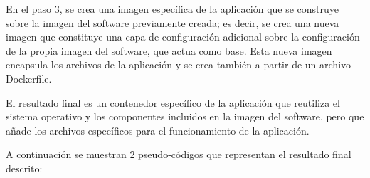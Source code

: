                 En el paso 3, se crea una imagen específica de la aplicación que se construye sobre la imagen del software previamente creada; es decir, se crea una nueva imagen que constituye una capa de configuración adicional sobre la configuración de la propia imagen del software, que actua como base. Esta nueva imagen encapsula los archivos de la aplicación y se crea también a partir de un archivo Dockerfile.

                El resultado final es un contenedor específico de la aplicación que reutiliza el sistema operativo y los componentes incluidos en la imagen del software, pero que añade los archivos específicos para el funcionamiento de la aplicación.

                A continuación se muestran 2 pseudo-códigos que representan el resultado final descrito:


